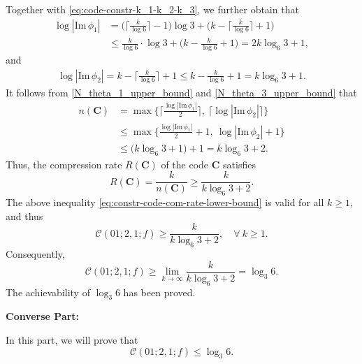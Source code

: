 \documentclass[11pt,draftclsnofoot,onecolumn]{IEEEtran}
\newcommand{\mbC}{\mathbf{C}}
\def\Im{\mathrm{Im}}
\begin{document}
Together with \eqref{eq:code-constr-k_1-k_2-k_3}, we further obtain that
\begin{align}
\log|\Im\,\phi_{1}|&=\bigg(\bigg\lceil\frac{k}{\log6}\bigg\rceil-1\bigg)\log3+\bigg( k-\bigg\lceil\frac{k}{\log6}\bigg\rceil+1\bigg)\nonumber\\
&\leq \frac{k}{\log6}\cdot\log3+\bigg( k-\frac{k}{\log6}+1 \bigg)= 2k\log_{6}3+1\label{N_theta_1_upper_bound},
\end{align}
and
\begin{align}
\log|\Im\,\phi_{2}|= k-\bigg\lceil\frac{k}{\log 6}\bigg\rceil+1
\leq k-\frac{k}{\log6}+1
= k\log_{6}3+1\label{N_theta_3_upper_bound}.
\end{align}
It follows from \eqref{N_theta_1_upper_bound} and \eqref{N_theta_3_upper_bound} that
\begin{align}
n(\mbC)& =\max\bigg\{\bigg\lceil\frac{\log|\Im\,\phi_{1}|}{2}\bigg\rceil,~\Big\lceil\log|\Im\,\phi_{2}|
\Big\rceil\bigg\}\nonumber\\
&\leq\max\bigg\{\frac{\log|\Im\,\phi_{1}|}{2}+1,~\log|\Im\,\phi_{2}|+1
\bigg\}\nonumber\\
&\leq\Big(k\log_{6}3+1\Big)+1=k\log_{6}3+2.\nonumber
\end{align}
 Thus,  the  compression rate $R(\mbC)$ of the  code $\mbC$ satisfies
\begin{equation}\label{eq:constr-code-com-rate-lower-bound}
R(\mbC)=\frac{k}{n(\mbC)}\geq \frac{k}{k\log_{6}3+2}.
\end{equation}
The above inequality \eqref{eq:constr-code-com-rate-lower-bound} is valid for all $k\geq 1$, and thus
\begin{equation*}
\mathcal{C}(01;2,1;f)\geq \frac{k}{k\log_{6}3+2},\quad\forall~k\geq 1.
\end{equation*}
Consequently,
\begin{equation*}
\mathcal{C}(01;2,1;f)\geq\lim_{k\to\infty} \frac{k}{k\log_{6}3+2}=\log_{3}6.
\end{equation*}
The achievability of $\log_{3}6$ has been proved.

\smallskip
\noindent\textbf{Converse Part:}


In this part, we will prove that
\begin{equation*}
\mathcal{C}(01;2,1;f)\leq\log_{3}6.\label{N_cap_upp_bound_log_3_6}
\end{equation*}
\end{document}
